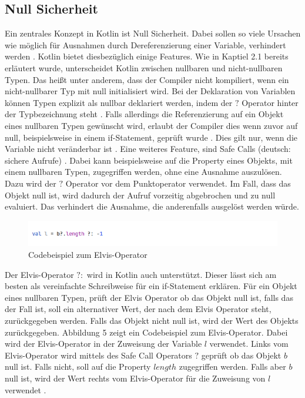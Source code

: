 \documentclass{article}
\begin{document}
\subsection{Null Sicherheit}
Ein zentrales Konzept in Kotlin ist Null Sicherheit. Dabei sollen so viele Ursachen wie möglich für Ausnahmen durch Dereferenzierung einer Variable, verhindert werden \cite{KotlinLangNullSafety}. Kotlin bietet diesbezüglich einige Features. Wie in Kaptiel 2.1 bereits erläutert wurde, unterscheidet Kotlin zwischen nullbaren und nicht-nullbaren Typen. Das heißt unter anderem, dass der Compiler nicht kompiliert, wenn ein nicht-nullbarer Typ mit null initialisiert wird. Bei der Deklaration von Variablen können Typen explizit als nullbar deklariert werden, indem der $?$ Operator hinter der Typbezeichnung steht \cite{KotlinLangNullSafety}. Falls allerdings die Referenzierung auf ein Objekt eines nullbaren Typen gewünscht wird, erlaubt der Compiler dies wenn zuvor auf null, beispielsweise in einem if-Statement, geprüft wurde \cite{KotlinLangNullSafety}. Dies gilt nur, wenn die Variable nicht veränderbar ist \cite{KotlinLangNullSafety}. \newline
Eine weiteres Feature, sind Safe Calls (deutsch: sichere Aufrufe) \cite{KotlinLangNullSafety}. Dabei kann beispielsweise auf die Property eines Objekts, mit einem nullbaren Typen, zugegriffen werden, ohne eine Ausnahme auszulösen. Dazu wird der $?$ Operator vor dem Punktoperator verwendet. Im Fall, dass das Objekt null ist, wird dadurch der Aufruf vorzeitig abgebrochen und zu null evaluiert. Das verhindert die Ausnahme, die anderenfalls ausgelöst werden würde.

\begin{figure}[!htb]
    \raggedright
    \includegraphics[width=\linewidth]{img/elvis_operator.png}
    \caption{Codebeispiel zum Elvis-Operator\footnotemark}
\end{figure}
Der Elvis-Operator $?:$ wird in Kotlin auch unterstützt. Dieser lässt sich am besten als vereinfachte Schreibweise für ein if-Statement erklären. Für ein Objekt eines nullbaren Typen, prüft der Elvis Operator ob das Objekt null ist, falls das der Fall ist, soll ein alternativer Wert, der nach dem Elvis Operator steht, zurückgegeben werden. Falls das Objekt nicht null ist, wird der Wert des Objekts zurückgegeben. Abbildung 5 zeigt ein Codebeispiel zum Elvis-Operator. Dabei wird der Elvis-Operator in der Zuweisung der Variable $l$ verwendet. Links vom Elvis-Operator wird mittels des Safe Call Operators $?$ geprüft ob das Objekt $b$ null ist. Falls nicht, soll auf die Property $length$ zugegriffen werden. Falls aber $b$ null ist, wird der Wert rechts vom Elvis-Operator für die Zuweisung von $l$ verwendet \cite{KotlinLangNullSafety}.
\end{document}
